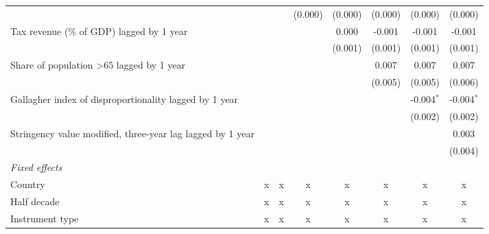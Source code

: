 \begin{tabular}{lccccccc}
                                                                                          &         &         & (0.000) & (0.000) & (0.000)      & (0.000)       & (0.000)\\   
   Tax revenue (\% of GDP) lagged by 1 year                                               &         &         &         & 0.000   & -0.001       & -0.001        & -0.001\\   
                                                                                          &         &         &         & (0.001) & (0.001)      & (0.001)       & (0.001)\\   
   Share of population >65 lagged by 1 year                                               &         &         &         &         & 0.007        & 0.007         & 0.007\\   
                                                                                          &         &         &         &         & (0.005)      & (0.005)       & (0.006)\\   
   Gallagher index of disproportionality lagged by 1 year                                 &         &         &         &         &              & -0.004$^{*}$  & -0.004$^{*}$\\   
                                                                                          &         &         &         &         &              & (0.002)       & (0.002)\\   
   Stringency value modified, three-year lag lagged by 1 year                             &         &         &         &         &              &               & 0.003\\   
                                                                                          &         &         &         &         &              &               & (0.004)\\   
   \emph{Fixed effects}\\
   Country                                                                                & x       & x       & x       & x       & x            & x             & x\\  
   Half decade                                                                            & x       & x       & x       & x       & x            & x             & x\\  
   Instrument type                                                                        & x       & x       & x       & x       & x            & x             & x\\  

\end{tabular}
